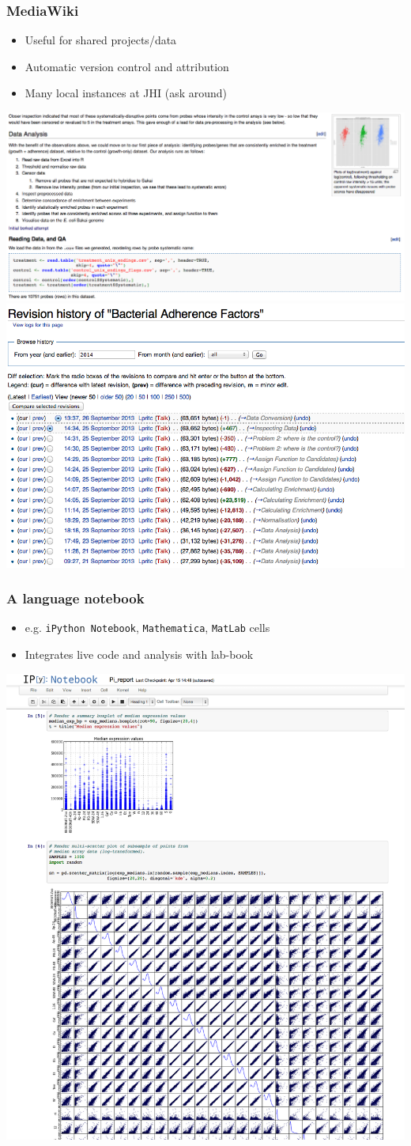 \documentclass[table]{beamer}
\begin{document}
   \begin{frame}
     \frametitle{MediaWiki}
     \begin{itemize}
       \item Useful for shared projects/data
       \item Automatic version control and attribution
       \item Many local instances at JHI (ask around)
     \end{itemize}
     \begin{center}
       \includegraphics[width=.4\textwidth]{images/mediawiki_after}
       \includegraphics[width=.4\textwidth]{images/mediawiki_version_control}     
     \end{center}
   \end{frame}
   
   \begin{frame}
     \frametitle{A language notebook}
     \begin{itemize}
       \item e.g. \texttt{iPython Notebook}, \texttt{Mathematica}, \texttt{MatLab} cells
       \item Integrates live code and analysis with lab-book
     \end{itemize}
     \begin{center}
       \includegraphics[width=.35\textwidth]{images/ipython_notebook}     
     \end{center}
   \end{frame}
\end{document}
